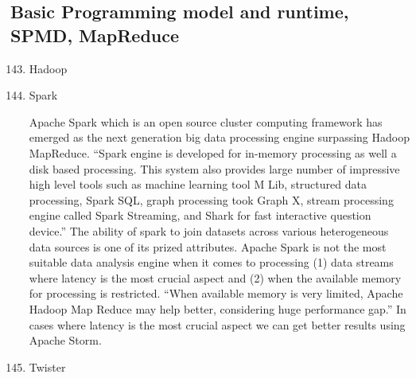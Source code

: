 \subsection{Basic Programming model and runtime, SPMD, MapReduce}
\label{\detokenize{i524/technologies:basic-programming-model-and-runtime-spmd-mapreduce}}\begin{enumerate}
\setcounter{enumi}{142}
\item {} 
Hadoop

\item {} 
Spark \label{\detokenize{i524/technologies:id278}}{\hyperref[\detokenize{i524/technologies:www-spark}]{\sphinxcrossref{{[}57{]}}}}

Apache Spark which is an open source cluster computing framework
has emerged as the next generation big data processing engine
surpassing Hadoop MapReduce. ``Spark engine is developed for
in-memory processing as well a disk based processing. This system
also provides large number of impressive high level tools such as
machine learning tool M Lib, structured data processing, Spark
SQL, graph processing took Graph X, stream processing engine
called Spark Streaming, and Shark for fast interactive question
device.'' The ability of spark to join datasets across various
heterogeneous data sources is one of its prized
attributes. Apache Spark is not the most suitable data analysis
engine when it comes to processing (1) data streams where latency
is the most crucial aspect and (2) when the available memory for
processing is restricted. ``When available memory is very limited,
Apache Hadoop Map Reduce may help better, considering huge
performance gap.'' In cases where latency is the most crucial
aspect we can get better results using Apache Storm.

\item {} 
Twister


\end{enumerate}
